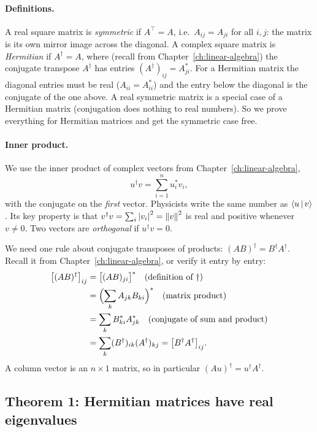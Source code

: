 \paragraph{Definitions.} A real square matrix is \emph{symmetric} if $A^\top=A$, i.e.\ $A_{ij}=A_{ji}$ for all $i,j$: the matrix is its own mirror image across the diagonal. A complex square matrix is \emph{Hermitian} if $A^\dagger=A$, where (recall from Chapter~\ref{ch:linear-algebra}) the conjugate transpose $A^\dagger$ has entries $(A^\dagger)_{ij}=A_{ji}^*$. For a Hermitian matrix the diagonal entries must be real ($A_{ii}=A_{ii}^*$) and the entry below the diagonal is the conjugate of the one above. A real symmetric matrix is a special case of a Hermitian matrix (conjugation does nothing to real numbers). So we prove everything for Hermitian matrices and get the symmetric case free.

\paragraph{Inner product.} We use the inner product of complex vectors from Chapter~\ref{ch:linear-algebra},
\begin{equation}
u^\dagger v=\sum_{i=1}^n u_i^*v_i,
\label{eq:eigen-inner}
\end{equation}
with the conjugate on the \emph{first} vector. Physicists write the same number as $\langle u\,|\,v\rangle$. Its key property is that $v^\dagger v=\sum_i\left\lvert v_i\right\rvert^2=\left\lVert v\right\rVert^2$ is real and positive whenever $v\ne0$. Two vectors are \emph{orthogonal} if $u^\dagger v=0$.

We need one rule about conjugate transposes of products: $(AB)^\dagger=B^\dagger A^\dagger$. Recall it from Chapter~\ref{ch:linear-algebra}, or verify it entry by entry:
\begin{align}
\bigl[(AB)^\dagger\bigr]_{ij}&=\bigl[(AB)_{ji}\bigr]^*\quad\text{(definition of }\dagger)\\
&=\Bigl(\sum_k A_{jk}B_{ki}\Bigr)^*\quad\text{(matrix product)}\\
&=\sum_k B_{ki}^*A_{jk}^*\quad\text{(conjugate of sum and product)}\\
&=\sum_k (B^\dagger)_{ik}(A^\dagger)_{kj}=\bigl[B^\dagger A^\dagger\bigr]_{ij}.
\end{align}
A column vector is an $n\times1$ matrix, so in particular $(Au)^\dagger=u^\dagger A^\dagger$.

\subsection{Theorem 1: Hermitian matrices have real eigenvalues}

